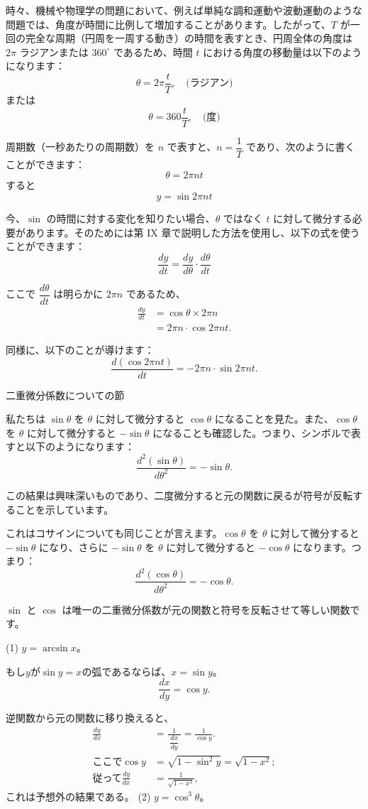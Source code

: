 \documentclass[a4paper,11pt,openany]{ltjsbook}
\begin{document}
時々、機械や物理学の問題において、例えば単純な調和運動や波動運動のような問題では、角度が時間に比例して増加することがあります。したがって、$T$ が一回の完全な周期（円周を一周する動き）の時間を表すとき、円周全体の角度は $2\pi$ ラジアンまたは $360^\circ$ であるため、時間 $t$ における角度の移動量は以下のようになります：
\[
\theta = 2\pi \frac{t}{T}, \quad \text{(ラジアン)}
\]
または
\[
\theta = 360 \frac{t}{T}, \quad \text{(度)}
\]

周期数（一秒あたりの周期数）を $n$ で表すと、$n = \dfrac{1}{T}$ であり、次のように書くことができます：
\[
\theta = 2\pi nt
\]
すると
\[
y = \sin 2\pi nt
\]

今、$\sin$ の時間に対する変化を知りたい場合、$\theta$ ではなく $t$ に対して微分する必要があります。そのためには第 IX 章で説明した方法を使用し、以下の式を使うことができます：
\[
\frac{dy}{dt} = \frac{dy}{d\theta} · \frac{d\theta}{dt}
\]

ここで $\dfrac{d\theta}{dt}$ は明らかに $2\pi n$ であるため、
\begin{align*}
\frac{dy}{dt} &= \cos \theta \times  2\pi n \\
              &= 2\pi n · \cos 2\pi nt.
\end{align*}

同様に、以下のことが導けます：
\[
\frac{d(\cos 2\pi nt)}{dt} = -2\pi n · \sin 2\pi nt.
\]

二重微分係数についての節

私たちは $\sin \theta$ を $\theta$ に対して微分すると $\cos \theta$ になることを見た。また、$\cos \theta$ を $\theta$ に対して微分すると $-\sin \theta$ になることも確認した。つまり、シンボルで表すと以下のようになります：
\[
\frac{d^2(\sin \theta)}{d\theta^2} = -\sin \theta.
\]

この結果は興味深いものであり、二度微分すると元の関数に戻るが符号が反転することを示しています。

これはコサインについても同じことが言えます。$\cos \theta$ を $\theta$ に対して微分すると $-\sin \theta$ になり、さらに $-\sin \theta$ を $\theta$ に対して微分すると $-\cos \theta$ になります。つまり：
\[
\frac{d^2(\cos \theta)}{d\theta^2} = -\cos \theta.
\]

$\sin$ と $\cos$ は唯一の二重微分係数が元の関数と符号を反転させて等しい関数です。

(1) $y=\arcsin x$。

もし$y$が$\sin y=x$の弧であるならば、$x=\sin y$。
\[
\frac{dx}{dy}=\cos y.
\]

逆関数から元の関数に移り換えると、
\begin{align*}
\frac{dy}{dx}
  &= \frac{1}{\;\dfrac{dx}{dy}\;} = \frac{1}{\cos y}. \\
\text{ここで}
\cos y
  &= \sqrt{1-\sin^2 y}=\sqrt{1-x^2}; \\
\text{従って}
\frac{dy}{dx}
  &= \frac{1}{\sqrt{1-x^2}},
\end{align*}
これは予想外の結果である。
(2) $y=\cos^3 \theta$。
\end{document}
